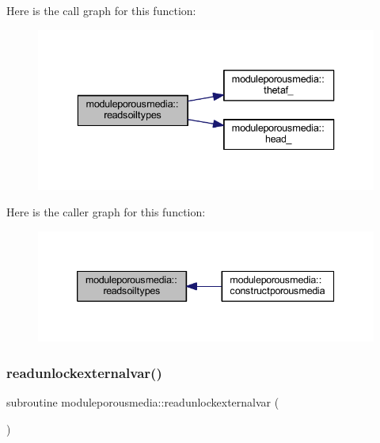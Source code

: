 Here is the call graph for this function\+:\nopagebreak
\begin{figure}[H]
\begin{center}
\leavevmode
\includegraphics[width=336pt]{namespacemoduleporousmedia_a7aef95520258c11f2ce4493e2bef61c8_cgraph}
\end{center}
\end{figure}
Here is the caller graph for this function\+:\nopagebreak
\begin{figure}[H]
\begin{center}
\leavevmode
\includegraphics[width=339pt]{namespacemoduleporousmedia_a7aef95520258c11f2ce4493e2bef61c8_icgraph}
\end{center}
\end{figure}
\mbox{\label{namespacemoduleporousmedia_ade70c21b16e6288bf0e789900f845c5a}} 
\subsubsection{\texorpdfstring{readunlockexternalvar()}{readunlockexternalvar()}}
{\footnotesize\ttfamily subroutine moduleporousmedia\+::readunlockexternalvar (\begin{DoxyParamCaption}{ }\end{DoxyParamCaption})\hspace{0.3cm}{\ttfamily [private]}}

